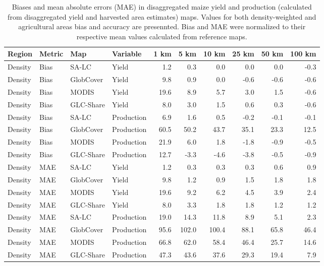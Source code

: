 \begin{longtable}{llllrrrrrr}
\caption{Biases and mean absolute errors (MAE) in disaggregated maize yield and production (calculated from disaggregated yield and harvested area estimates) maps. Values for both density-weighted and agricultural areas bias and accuracy are presennted. Bias and MAE were normalized to their respective mean values calculated from reference maps.} \\ 
  \hline
Region & Metric & Map & Variable & 1 km & 5 km & 10 km & 25 km & 50 km & 100 km \\ 
  \hline
Density & Bias & SA-LC & Yield & 1.2 & 0.3 & 0.0 & 0.0 & 0.0 & -0.3 \\ 
  Density & Bias & GlobCover & Yield & 9.8 & 0.9 & 0.0 & -0.6 & -0.6 & -0.6 \\ 
  Density & Bias & MODIS & Yield & 19.6 & 8.9 & 5.7 & 3.0 & 1.5 & -0.6 \\ 
  Density & Bias & GLC-Share & Yield & 8.0 & 3.0 & 1.5 & 0.6 & 0.3 & -0.6 \\ 
  Density & Bias & SA-LC & Production & 6.9 & 1.6 & 0.5 & -0.2 & -0.1 & -0.1 \\ 
  Density & Bias & GlobCover & Production & 60.5 & 50.2 & 43.7 & 35.1 & 23.3 & 12.5 \\ 
  Density & Bias & MODIS & Production & 21.9 & 6.0 & 1.8 & -1.8 & -0.9 & -0.5 \\ 
  Density & Bias & GLC-Share & Production & 12.7 & -3.3 & -4.6 & -3.8 & -0.5 & -0.9 \\ 
  Density & MAE & SA-LC & Yield & 1.2 & 0.3 & 0.3 & 0.3 & 0.6 & 0.9 \\ 
  Density & MAE & GlobCover & Yield & 9.8 & 1.2 & 0.9 & 1.5 & 1.8 & 1.8 \\ 
  Density & MAE & MODIS & Yield & 19.6 & 9.2 & 6.2 & 4.5 & 3.9 & 2.4 \\ 
  Density & MAE & GLC-Share & Yield & 8.0 & 3.3 & 1.8 & 1.8 & 1.2 & 1.2 \\ 
  Density & MAE & SA-LC & Production & 19.0 & 14.3 & 11.8 & 8.9 & 5.1 & 2.3 \\ 
  Density & MAE & GlobCover & Production & 95.6 & 102.0 & 100.4 & 88.1 & 65.8 & 46.4 \\ 
  Density & MAE & MODIS & Production & 66.8 & 62.0 & 58.4 & 46.4 & 25.7 & 14.6 \\ 
  Density & MAE & GLC-Share & Production & 47.3 & 43.6 & 37.6 & 29.3 & 19.4 & 7.9 \\ 

\end{longtable}
